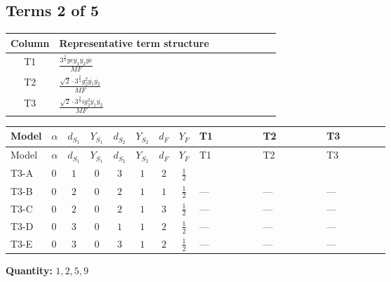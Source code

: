 \documentclass[8pt]{article}
\begin{document}
\begin{landscape}
\subsection*{Terms 2 of 5}
\begin{center}
\begin{tabular}{@{}c >{\raggedright\arraybackslash}p{0.82\linewidth}@{}}
\toprule
Column & Representative term structure \\
\midrule
T1 & \(\displaystyle \frac{3^{\frac{3}{4}} ye \overline{y_{1}} \overline{y_{2}} \overline{ye}}{MF}\) \\
\midrule
T2 & \(\displaystyle \frac{\sqrt{2} \cdot 3^{\frac{3}{4}} g_{2}^{2} \overline{y_{1}} \overline{y_{2}}}{MF}\) \\
\midrule
T3 & \(\displaystyle \frac{\sqrt{2} \cdot 3^{\frac{3}{4}} i g_{2}^{2} \overline{y_{1}} \overline{y_{2}}}{MF}\) \\
\midrule
\bottomrule
\end{tabular}
\end{center}
\smallskip
\tiny
\begin{longtable}{@{}llcccccc >{\raggedright\arraybackslash}p{0.21\linewidth} >{\raggedright\arraybackslash}p{0.21\linewidth} >{\raggedright\arraybackslash}p{0.21\linewidth}@{}}
\toprule
Model & $\alpha$ & $d_{S_1}$ & $Y_{S_1}$ & $d_{S_2}$ & $Y_{S_2}$ & $d_F$ & $Y_F$ & T1 & T2 & T3 \\
\midrule
\endfirsthead
\toprule
Model & $\alpha$ & $d_{S_1}$ & $Y_{S_1}$ & $d_{S_2}$ & $Y_{S_2}$ & $d_F$ & $Y_F$ & T1 & T2 & T3 \\
\midrule
\endhead
T3-A & $0$ & $1$ & $0$ & $3$ & $1$ & $2$ & $\frac{1}{2}$ & \scriptsize\adjustbox{max width=\linewidth}{$\begin{gathered} - \frac{3^{\frac{3}{4}} ye \overline{y_{1}} \overline{y_{2}} \overline{ye}}{12 MF}\end{gathered}$} & \scriptsize\adjustbox{max width=\linewidth}{$\begin{gathered} \frac{\sqrt{2} \cdot 3^{\frac{3}{4}} g_{2}^{2} \overline{y_{1}} \overline{y_{2}}}{6 MF}\end{gathered}$} & \scriptsize\adjustbox{max width=\linewidth}{$\begin{gathered} - \frac{\sqrt{2} \cdot 3^{\frac{3}{4}} i g_{2}^{2} \overline{y_{1}} \overline{y_{2}}}{6 MF}\end{gathered}$} \\
\midrule
T3-B & $0$ & $2$ & $0$ & $2$ & $1$ & $1$ & $\frac{1}{2}$ & --- & --- & --- \\
\midrule
T3-C & $0$ & $2$ & $0$ & $2$ & $1$ & $3$ & $\frac{1}{2}$ & --- & --- & --- \\
\midrule
T3-D & $0$ & $3$ & $0$ & $1$ & $1$ & $2$ & $\frac{1}{2}$ & --- & --- & --- \\
\midrule
T3-E & $0$ & $3$ & $0$ & $3$ & $1$ & $2$ & $\frac{1}{2}$ & --- & --- & --- \\
\midrule
\bottomrule
\end{longtable}
\clearpage
\noindent\textbf{Quantity: }$\mathrm{1,2,5,9}$\par\smallskip

\end{landscape}
\end{document}
